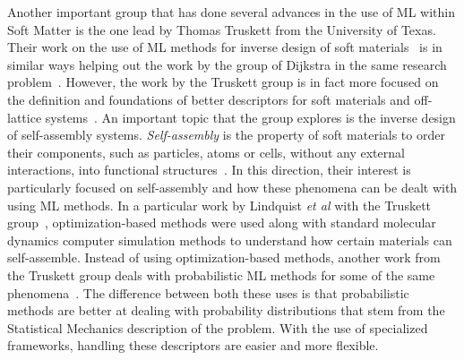 Another important group that has done several advances in the use of ML within Soft Matter
is the one lead by Thomas Truskett from the University of Texas.
Their work on the use of ML methods for inverse design of soft materials~\cite{shermanInverseMethodsDesign2020a}
is in similar ways helping out the work by the group of Dijkstra in the same research
problem~\cite{APSAPSMarcha}.
However, the work by the Truskett group is in fact more focused on the definition and
foundations of better descriptors for soft materials and off-lattice systems~\cite{jadrichUnsupervisedMachineLearning2018}.
An important topic that the group explores is the inverse design of self-assembly
systems. \emph{Self-assembly} is the property of soft materials to order their
components, such as particles, atoms or cells, without any external interactions,
into functional structures~\cite{grzybowskiSelfassemblyCrystalsCells2009}.
In this direction, their interest is particularly focused on self-assembly and how these 
phenomena can be dealt with using ML methods.
In a particular work by Lindquist \emph{et al} with the Truskett group~\cite{lindquistCommunicationInverseDesign2016},
optimization-based methods were used along with standard molecular dynamics computer
simulation methods to understand how certain materials can self-assemble.
Instead of using optimization-based methods, another work from the Truskett group
deals with probabilistic ML methods for some of the same phenomena~\cite{jadrichProbabilisticInverseDesign2017}.
The difference between both these uses is that probabilistic methods are better at dealing
with probability distributions that stem from the Statistical Mechanics description of the
problem. With the use of specialized frameworks, handling these descriptors are easier
and more flexible.

